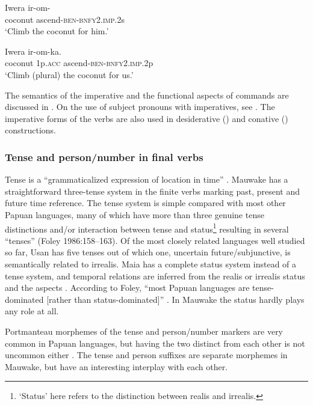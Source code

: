 \ea%
\label{ex:3:x232}
\gll Iwera ir-om- \\
coconut ascend-\textsc{ben}-\textsc{bnfy}2.\textsc{imp}.2s \\
\glt`Climb the coconut for him.'
\z

\ea%
\label{ex:3:x233}
\gll Iwera  ir-om-ka. \\
coconut 1p.\textsc{acc} ascend-\textsc{ben}-\textsc{bnfy}2.\textsc{imp}.2p \\
\glt`Climb (plural) the coconut for us.'
\z

The semantics of the imperative and the functional aspects of commands are discussed in . On the use of subject pronouns with imperatives, see . The imperative forms of the verbs are also used in desiderative () and conative () constructions. 

\subsubsection{Tense and person/number in final verbs}\label{sec:3:z:y:x}
{}
Tense is a ``{grammaticalized expression of location in time}'' \citep[9]{Comrie1985}. Mauwake has a straightforward three-tense system in the finite verbs marking past, present and future time reference. The tense system is simple compared with most other Papuan languages, many of which have more than three genuine tense distinctions and/or interaction between tense and status\footnote{`Status' here refers to the distinction between realis and irrealis.} resulting in several ``tenses'' ({Foley 1986}:158--163). Of the most closely related languages well studied so far, Usan has five tenses \citep[98]{Reesink1987} out of which one, uncertain future/subjunctive, is semantically related to irrealis. Maia has a complete status system instead of a tense system, and temporal relations are inferred from the realis or irrealis status and the aspects \citep[55]{Hardin2002}. According to {Foley}, {``most Papuan languages are tense-dominated [rather than status-dominated]''} \citeyear[162]{Foley1986}. In Mauwake the status hardly plays any role at all.

Portmanteau morphemes of the tense and person/number markers are very common in Papuan languages, but having the two distinct from each other is not uncommon either \citep[137]{Foley1986}. The tense and person suffixes are separate morphemes in Mauwake, but have an interesting interplay with each other.

